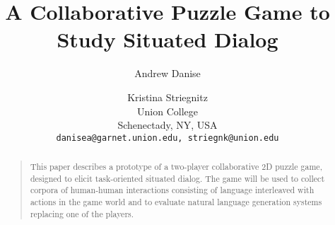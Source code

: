 \documentclass[letterpaper]{article}
\begin{document}
%
\title{A Collaborative Puzzle Game to Study Situated Dialog}
\author{
Andrew Danise \and Kristina Striegnitz\\
Union College\\
Schenectady, NY, USA\\
\texttt{danisea@garnet.union.edu, striegnk@union.edu}
}
\maketitle
\begin{abstract}
\begin{quote}
This paper describes a prototype of a two-player collaborative 2D puzzle game,
designed to elicit task-oriented situated dialog. The game will be
used to collect corpora of human-human interactions consisting of
language interleaved with actions in the game world and to evaluate natural
language generation systems replacing one of the players.
\end{quote}
\end{abstract}











\end{document}
